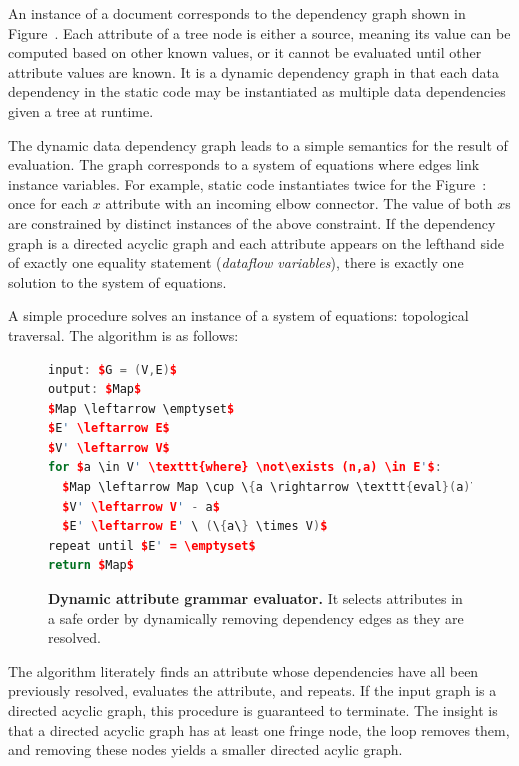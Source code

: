 An instance of a document corresponds to the dependency graph shown in Figure~. Each attribute of a tree node is either a source, meaning its value can be computed based on other known values, or it cannot be evaluated until other attribute values are known. It is a dynamic dependency graph in that each data dependency in the static code may be instantiated as multiple data dependencies given a tree at runtime. 

The dynamic data dependency graph leads to a simple semantics for the result of evaluation. The graph corresponds to a system of equations where edges link instance variables. For example, static code  instantiates twice for the Figure~: once for each $x$ attribute with an incoming elbow connector. The value of both $x$s are constrained by distinct instances of the above constraint. If the dependency graph is a directed acyclic graph and each attribute appears on the lefthand side of exactly one equality statement (\emph{dataflow variables}), there is exactly one solution to the system of equations.

A simple procedure solves an instance of a system of equations: topological traversal. The algorithm is as follows:
\begin{figure}
\centering
\begin{minipage}{0.8\columnwidth}
\begin{lstlisting}[mathescape,language=C++,morekeywords={for,in,where,input,output,repeat,until,return}]
input: $G = (V,E)$
output: $Map$
$Map \leftarrow \emptyset$
$E' \leftarrow E$
$V' \leftarrow V$
for $a \in V' \texttt{where} \not\exists (n,a) \in E'$:
  $Map \leftarrow Map \cup \{a \rightarrow \texttt{eval}(a)\}$
  $V' \leftarrow V' - a$
  $E' \leftarrow E' \ (\{a\} \times V)$
repeat until $E' = \emptyset$
return $Map$
\end{lstlisting}
\end{minipage}
\caption{\textbf{Dynamic attribute grammar evaluator.} It selects attributes in a safe order by dynamically removing dependency edges as they are resolved. }
\label{fig:dyneval}
\end{figure}
The algorithm literately finds an attribute whose dependencies have all been previously resolved, evaluates the attribute, and repeats. If the input graph is a directed acyclic graph, this procedure is guaranteed to terminate. The insight is that a directed acyclic graph has at least one fringe node, the loop removes them, and removing these nodes yields a smaller directed acylic graph.

